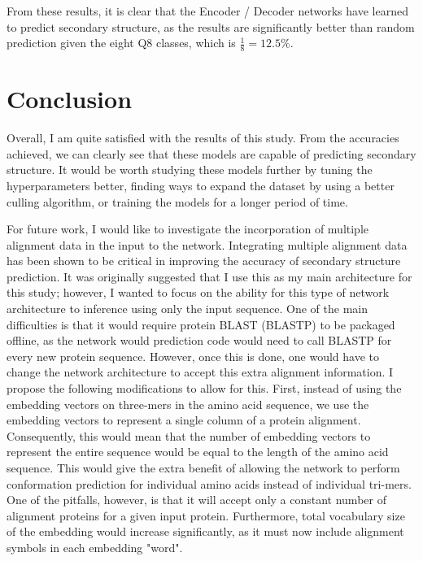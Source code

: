 \documentclass[pageno]{jpaper}
\begin{document}
From these results, it is clear that the Encoder / Decoder networks have learned to predict secondary structure, as the results are significantly better than random prediction given the eight Q8 classes, which is $\frac{1}{8} = 12.5\%$.

\section{Conclusion}
Overall, I am quite satisfied with the results of this study.  From the accuracies achieved, we can clearly see that these models are capable of predicting secondary structure.  It would be worth studying these models further by tuning the hyperparameters better, finding ways to expand the dataset by using a better culling algorithm, or training the models for a longer period of time.

\par
For future work, I would like to investigate the incorporation of multiple alignment data in the input to the network.  Integrating multiple alignment data has been shown to be critical in improving the accuracy of secondary structure prediction.  It was originally suggested that I use this as my main architecture for this study; however, I wanted to focus on the ability for this type of network architecture to inference using only the input sequence.  One of the main difficulties is that it would require protein BLAST (BLASTP) to be packaged offline, as the network would prediction code would need to call BLASTP for every new protein sequence.  However, once this is done, one would have to change the network architecture to accept this extra alignment information.  I propose the following modifications to allow for this.  First, instead of using the embedding vectors on three-mers in the amino acid sequence, we use the embedding vectors to represent a single column of a protein alignment.  Consequently, this would mean that the number of embedding vectors to represent the entire sequence would be equal to the length of the amino acid sequence.  This would give the extra benefit of allowing the network to perform conformation prediction for individual amino acids instead of individual tri-mers.  One of the pitfalls, however, is that it will accept only a constant number of alignment proteins for a given input protein.  Furthermore, total vocabulary size of the embedding would increase significantly, as it must now include alignment symbols in each embedding "word".
\end{document}
